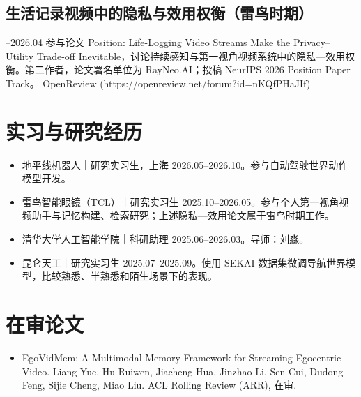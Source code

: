 \documentclass[a4paper,10pt]{ctexart}
\begin{document}
\subsection*{生活记录视频中的隐私与效用权衡（雷鸟时期）}
\par{}–2026.04
参与论文 Position: Life-Logging Video Streams Make the Privacy–Utility Trade-off Inevitable，讨论持续感知与第一视角视频系统中的隐私—效用权衡。第二作者，论文署名单位为 RayNeo.AI；投稿 NeurIPS 2026 Position Paper Track。
OpenReview (https://openreview.net/forum?id=nKQfPHaJIf)
\par\smallskip
\section*{实习与研究经历}
\par\smallskip
\begin{itemize}
\item 地平线机器人｜研究实习生，上海 2026.05–2026.10。参与自动驾驶世界动作模型开发。
\item 雷鸟智能眼镜（TCL）｜研究实习生 2025.10–2026.05。参与个人第一视角视频助手与记忆构建、检索研究；上述隐私—效用论文属于雷鸟时期工作。
\item 清华大学人工智能学院｜科研助理 2025.06–2026.03。导师：刘淼。
\item 昆仑天工｜研究实习生 2025.07–2025.09。使用 SEKAI 数据集微调导航世界模型，比较熟悉、半熟悉和陌生场景下的表现。
\end{itemize}
\par\smallskip
\section*{在审论文}
\begin{itemize}
\item EgoVidMem: A Multimodal Memory Framework for Streaming Egocentric Video. Liang Yue, Hu Ruiwen, Jiacheng Hua, Jinzhao Li, Sen Cui, Dudong Feng, Sijie Cheng, Miao Liu. ACL Rolling Review (ARR), 在审.
\end{itemize}
\end{document}
